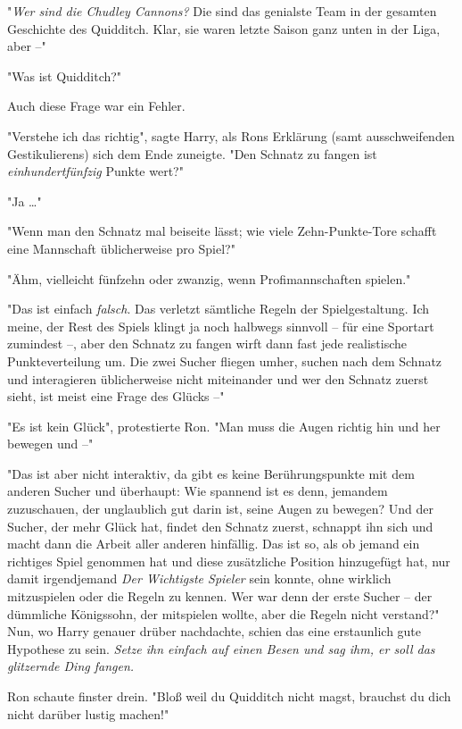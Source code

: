 {"\emph{Wer sind die Chudley Cannons?} Die sind das genialste Team in der gesamten Geschichte des Quidditch. Klar, sie waren letzte Saison ganz unten in der Liga, aber --"

"Was ist Quidditch?"

Auch diese Frage war ein Fehler.

"Verstehe ich das richtig", sagte Harry, als Rons Erklärung (samt ausschweifenden Gestikulierens) sich dem Ende zuneigte. "Den Schnatz zu fangen ist \emph{einhundertfünfzig} Punkte wert?"

"Ja …"

"Wenn man den Schnatz mal beiseite lässt; wie viele Zehn-Punkte-Tore schafft eine Mannschaft üblicherweise pro Spiel?"

"Ähm, vielleicht fünfzehn oder zwanzig, wenn Profimannschaften spielen."

"Das ist einfach \emph{falsch}. Das verletzt sämtliche Regeln der Spielgestaltung. Ich meine, der Rest des Spiels klingt ja noch halbwegs sinnvoll -- für eine Sportart zumindest --, aber den Schnatz zu fangen wirft dann fast jede realistische Punkteverteilung um. Die zwei Sucher fliegen umher, suchen nach dem Schnatz und interagieren üblicherweise nicht miteinander und wer den Schnatz zuerst sieht, ist meist eine Frage des Glücks --"

"Es ist kein Glück", protestierte Ron. "Man muss die Augen richtig hin und her bewegen und --"

"Das ist aber nicht interaktiv, da gibt es keine Berührungspunkte mit dem anderen Sucher und überhaupt: Wie spannend ist es denn, jemandem zuzuschauen, der unglaublich gut darin ist, seine Augen zu bewegen? Und der Sucher, der mehr Glück hat, findet den Schnatz zuerst, schnappt ihn sich und macht dann die Arbeit aller anderen hinfällig. Das ist so, als ob jemand ein richtiges Spiel genommen hat und diese zusätzliche Position hinzugefügt hat, nur damit irgendjemand \emph{Der Wichtigste Spieler} sein konnte, ohne wirklich mitzuspielen oder die Regeln zu kennen. Wer war denn der erste Sucher -- der dümmliche Königssohn, der mitspielen wollte, aber die Regeln nicht verstand?"\\ Nun, wo Harry genauer drüber nachdachte, schien das eine erstaunlich gute Hypothese zu sein. \emph{Setze ihn einfach auf einen Besen und sag ihm, er soll das glitzernde Ding fangen.}

Ron schaute finster drein. "Bloß weil du Quidditch nicht magst, brauchst du dich nicht darüber lustig machen!"

}
